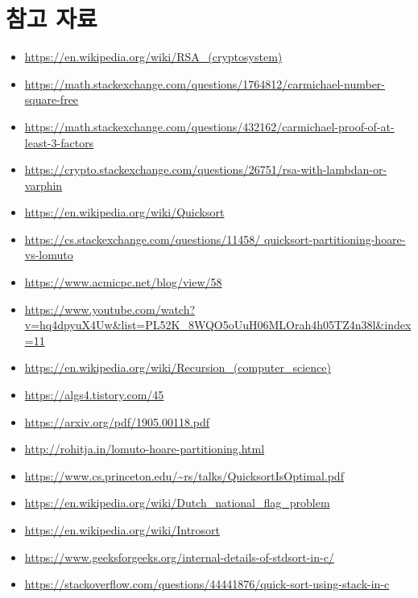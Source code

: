 
\section*{참고 자료}

\begin{itemize}
    \item \url{https://en.wikipedia.org/wiki/RSA_(cryptosystem)}

    \item \url{https://math.stackexchange.com/questions/1764812/carmichael-number-square-free}
    
    \item \url{https://math.stackexchange.com/questions/432162/carmichael-proof-of-at-least-3-factors}
    \item \url{https://crypto.stackexchange.com/questions/26751/rsa-with-lambdan-or-varphin}
    
    \item \url{https://en.wikipedia.org/wiki/Quicksort} \\
    \item \url{https://cs.stackexchange.com/questions/11458/ quicksort-partitioning-hoare-vs-lomuto} \\
    \item \url{https://www.acmicpc.net/blog/view/58} \\
    \item \url{https://www.youtube.com/watch?v=hq4dpyuX4Uw&list=PL52K_8WQO5oUuH06MLOrah4h05TZ4n38l&index=11} \\
    \item \url{https://en.wikipedia.org/wiki/Recursion_(computer_science)} \\
    \item \url{https://algs4.tistory.com/45} \\
    \item \url{https://arxiv.org/pdf/1905.00118.pdf} \\
    \item \url{http://rohitja.in/lomuto-hoare-partitioning.html} \\


    \item \url{https://www.cs.princeton.edu/~rs/talks/QuicksortIsOptimal.pdf}
    \item \url{https://en.wikipedia.org/wiki/Dutch_national_flag_problem}\\
    \item \url{https://en.wikipedia.org/wiki/Introsort}\\
    \item \url{https://www.geeksforgeeks.org/internal-details-of-stdsort-in-c/}
    \item \url{https://stackoverflow.com/questions/44441876/quick-sort-using-stack-in-c}


\end{itemize}
